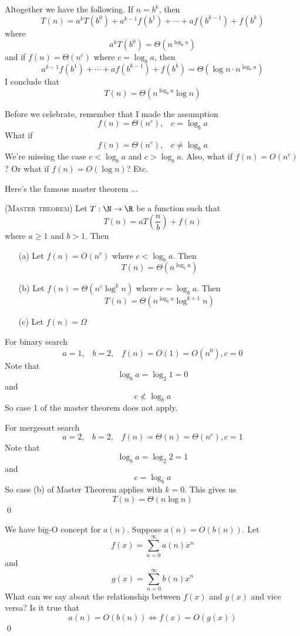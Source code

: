 Altogether we have the following.
If $n = b^k$, then
\[
T(n) = a^k T \left( b^0 \right)
 + a^{k-1} f(b^1) + \cdots + a f(b^{k-1}) + f(b^k)
\]
where
\[
a^k T \left( b^0 \right) = \Theta \left( n^{\log_b a} \right)
\]
and if $f(n) = \Theta(n^c)$ where $c = \log_b a$, then
\[
a^{k-1} f(b^1) + \cdots + a f(b^{k-1}) + f(b^k) =
\Theta \left( \log n \cdot  n^{\log_b a}\right)
\]
I conclude that 
\[
T(n)
=
\Theta \left( n^{\log_b a} \log n \right)
\]

Before we celebrate, remember that I made the assumption
\[
f(n) = \Theta(n^c), \,\,\,\,\, c = \log_b a
\]
What if
\[
f(n) = \Theta(n^c), \,\,\,\,\, c \neq \log_b a
\]
We're missing the case $c < \log_b a$ and $c > \log_b a$.
Also, what if $f(n) = O(n^c)$?
Or what if $f(n) = O(\log n)$?
Etc.

Here's the famous master theorem ...


\newpage
\begin{thm} \textsc{(Master theorem)}
Let $T : \N \rightarrow \R$ be a function such that
\[
T(n)
= a T \left( \frac{n}{b} \right) + f(n)
\]
where $a \geq 1$ and $b > 1$.
Then
\begin{enumerate}
  \item[(a)] Let $f(n) = O(n^c)$ where $c <  \log_b a$. Then
  \[
  T(n) = \Theta \left( n^{\log_b a} \right)
  \]
  
  \item[(b)] Let $f(n) = \Theta(n^c \log^k n)$ where $c = \log_b a$. Then
  \[
  T(n) = \Theta \left( n^{\log_b a} \log^{k+1} n \right)
  \]

  \item[(c)] Let $f(n) = \Omega$
\end{enumerate}
\end{thm}

\newpage
\begin{eg}
  For binary search
  \[
  a = 1, \,\,\,\,\, b = 2, \,\,\,\,\, f(n) = O(1) = O(n^0), c = 0
  \]
  Note that
  \[
  \log_b a = \log_2 1 = 0
  \]
  and
  \[
  c \not< \log_b a
  \]
  So case 1 of the master theorem does not apply.
\end{eg}

\begin{eg}
  For mergesort search
  \[
  a = 2, \,\,\,\,\, b = 2, \,\,\,\,\, f(n) = \Theta(n) = \Theta(n^c), c = 1
  \]
  Note that
  \[
  \log_b a = \log_2 2 = 1
  \]
  and
  \[
  c = \log_b a
  \]
  So case (b) of Master Theorem applies with $k = 0$.
  This gives us
  \[
  T(n) = \Theta(n \log n)
  \]
  \qed
\end{eg}


\begin{ex}
We have big-O concept for $a(n)$.
Suppose $a(n) = O(b(n))$.
Let
\[
f(x) = \sum_{n = 0}^\infty a(n) x^n
\]
and
\[
g(x) = \sum_{n = 0}^\infty b(n) x^n
\]
What can we say about the relationship between $f(x)$ and $g(x)$ and
vice versa?
Is it true that
\[
a(n) = O(b(n)) \iff f(x) = O(g(x))
\]
\qed
\end{ex}
